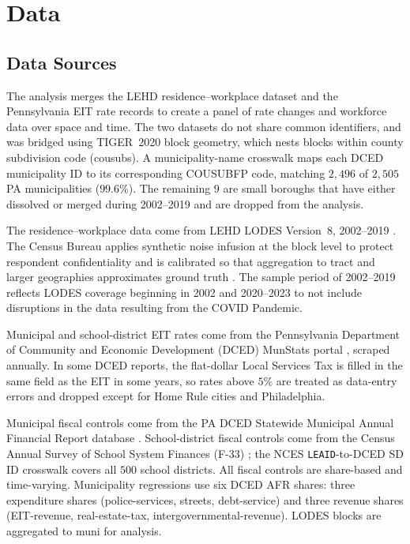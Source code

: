 \documentclass[12pt]{article}
\begin{document}
\section{Data}
\label{sec:data}

\subsection{Data Sources}
\label{subsec:sources}
\label{subsec:sample}
\label{subsec:pipeline}

The analysis merges the LEHD  residence--workplace dataset and the  Pennsylvania EIT rate records to create a panel of rate changes and workforce data over space and time. The two datasets do not share common identifiers, and was bridged using TIGER~2020 block geometry, which
nests blocks within county subdivision code (cousubs). A
municipality-name crosswalk maps each DCED municipality ID to its
corresponding COUSUBFP code, matching $2{,}496$ of $2{,}505$ PA municipalities
($99.6\%$). The remaining $9$ are small boroughs that have either dissolved or
merged during 2002--2019 and are dropped from the analysis.

The residence--workplace data come from LEHD LODES Version~8,
2002--2019 \citep{lehdLODES}. The Census Bureau applies
synthetic noise infusion at the block level to protect respondent
confidentiality and is calibrated so that aggregation to tract and larger
geographies approximates ground truth
\citep{grahamDESIGNCOMPARISONLODES}. The sample period of 2002--2019
reflects LODES coverage beginning in 2002 and
2020--2023 to not include disruptions in the data resulting from the COVID Pandemic.

Municipal and school-district EIT rates come from the Pennsylvania
Department of Community and Economic Development (DCED) MunStats
portal \citep{padcedMunStats}, scraped annually. In some DCED reports, the flat-dollar Local Services Tax is filled in the same field
as the EIT in some years, so rates above $5\%$ are treated as
data-entry errors and dropped except for Home Rule cities and Philadelphia.

Municipal fiscal controls come from the PA DCED Statewide Municipal
Annual Financial Report database \citep{padcedAFR}. School-district
fiscal controls come from the Census Annual Survey of School System
Finances (F-33) \citep{censusF33}; the NCES \texttt{LEAID}-to-DCED
SD ID crosswalk covers all $500$ school districts. All fiscal
controls are share-based and time-varying. Municipality regressions
use six DCED AFR shares: three expenditure shares
(police-services, streets, debt-service) and three revenue shares
(EIT-revenue, real-estate-tax, intergovernmental-revenue).
LODES blocks are aggregated to muni for analysis.
\end{document}
